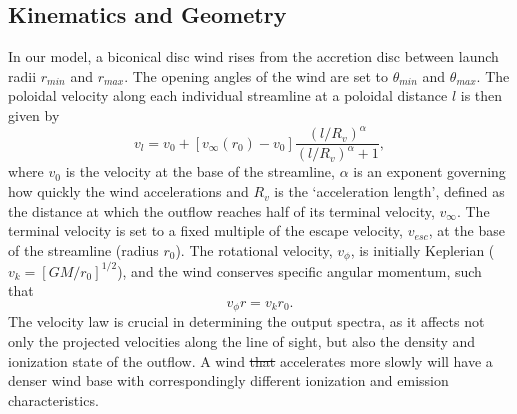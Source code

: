 \documentclass[preprint, a4paper, 11pt]{aastex}
\providecommand{\DIFadd}[1]{{\protect\color{blue}\uwave{#1}}} %
\providecommand{\DIFdel}[1]{{\protect\color{red}\sout{#1}}}                      %
\providecommand{\DIFaddbegin}{} %
\providecommand{\DIFaddend}{} %
\providecommand{\DIFdelbegin}{} %
\providecommand{\DIFdelend}{} %
\begin{document}







\DIFaddend \subsection{Kinematics and Geometry}

In our model, a biconical disc wind rises from the accretion 
disc between launch radii $r_{min}$ and $r_{max}$.
The opening angles of the wind are set to $\theta_{min}$ and $\theta_{max}$.
The poloidal velocity along each individual streamline at a poloidal distance $l$ 
is then given by
\begin{equation}
v_l=v_0+\left[v_{\infty}(r_0)-v_0\right]\frac{\left(l/R_v\right)^{\alpha}}{\left(l/R_v\right)^{\alpha}+1},
\label{v_law}
\end{equation}
where $v_0$ is the velocity at the base of the streamline, $\alpha$ is
an exponent governing how quickly the wind accelerations and 
$R_v$ is the `acceleration length', defined as the distance at which
the outflow reaches half of its terminal velocity, $v_{\infty}$.
The terminal velocity is set to a fixed multiple of the escape
velocity, $v_{esc}$, at the base of the streamline (radius $r_0$).
The rotational velocity, $v_{\phi}$, is initially Keplerian ($v_k = [GM/r_0]^{1/2}$),
and the wind conserves specific angular momentum, such that 
\begin{equation}
v_{\phi} r = v_k r_0.
\label{v_law}
\end{equation}
The velocity law is crucial in determining the output spectra,
as it affects not only the projected velocities along the line of sight,
but also the density and ionization state of the outflow.
A wind \DIFdelbegin \DIFdel{that }\DIFdelend \DIFaddbegin \DIFadd{which }\DIFaddend accelerates more slowly will have a denser wind base
with correspondingly different ionization and emission characteristics.
\end{document}
